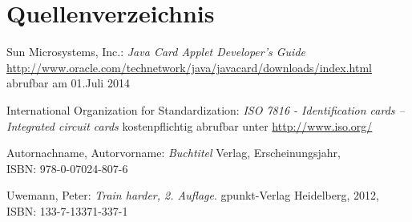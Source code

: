 \documentclass[a4paper,12pt]{scrartcl}
\begin{document}
\clearpage
\section{Quellenverzeichnis}
\label{sec:6}
\renewcommand\refname{Quellenverzeichnis}
\begin{thebibliography}{999}

Sun Microsystems, Inc.:  {\sl Java Card Applet Developer's Guide}\\
\url{http://www.oracle.com/technetwork/java/javacard/downloads/index.html}\\
abrufbar am 01.Juli 2014

International Organization for Standardization: {\sl ISO 7816 - Identification cards -- Integrated circuit cards}
kostenpflichtig abrufbar unter \url{http://www.iso.org/}

Autornachname, Autorvorname:  {\sl Buchtitel} Verlag, Erscheinungsjahr,
\\ISBN:  978-0-07024-807-6

Uwemann, Peter:  {\sl Train harder, 2. Auflage}. gpunkt-Verlag Heidelberg, 2012,
\\ISBN: 133-7-13371-337-1


\end{thebibliography}
\end{document}
